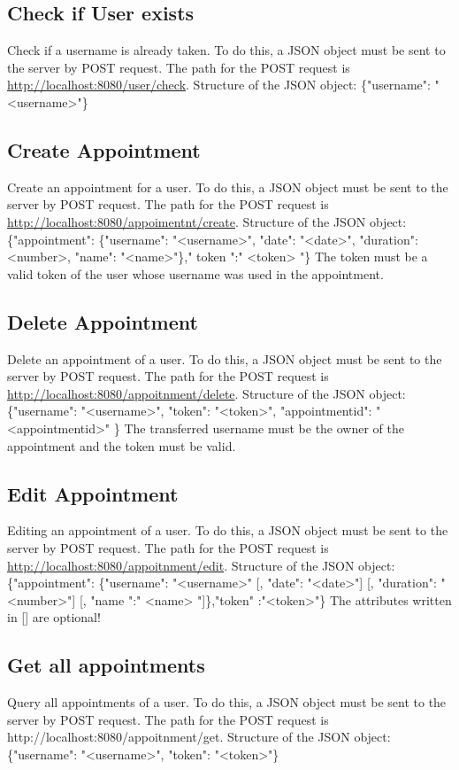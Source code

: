 \documentclass[12pt]{scrartcl}
\begin{document}
    \subsection{Check if User exists}
        Check if a username is already taken.
        To do this, a JSON object must be sent to the server by POST request. The path for the POST request is
        \url{http://localhost:8080/user/check}.
        Structure of the JSON object: \{"username": "<username>"\}

    \subsection{Create Appointment}
        Create an appointment for a user.
        To do this, a JSON object must be sent to the server by POST request. The path for the POST request is
        \url{http://localhost:8080/appoimentnt/create}.
        Structure of the JSON object: \{"appointment": \{"username": "<username>", "date": "<date>", "duration": <number>, "name": "<name>"\}," token ":" <token> "\}
        The token must be a valid token of the user whose username was used in the appointment.

    \subsection{Delete Appointment}
        Delete an appointment of a user.
        To do this, a JSON object must be sent to the server by POST request. The path for the POST request is
        \url{http://localhost:8080/appoitnment/delete}.
        Structure of the JSON object: \{"username": "<username>", "token": "<token>", "appointmentid": "<appointmentid>" \}
        The transferred username must be the owner of the appointment and the token must be valid.

    \subsection{Edit Appointment}
        Editing an appointment of a user.
        To do this, a JSON object must be sent to the server by POST request. The path for the POST request is \url{http://localhost:8080/appoitnment/edit}.
        Structure of the JSON object: \{"appointment": \{"username": "<username>" [, "date": "<date>"] [, "duration": "<number>"] [, "name ":" <name> "]\},"token" :"<token>"\}
        The attributes written in {[]} are optional!
    

    \subsection{Get all appointments}
        Query all appointments of a user.
        To do this, a JSON object must be sent to the server by POST request. The path for the POST request is
        http://localhost:8080/appoitnment/get.
        Structure of the JSON object: \{"username": "<username>", "token": "<token>"\}
\end{document}
